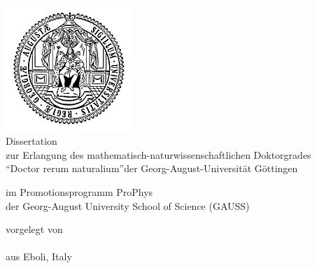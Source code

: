 
\begin{titlepage}
    \begin{center}
        \large  

        \hfill

        \vfill

        \begingroup
            \color{Maroon}\spacedallcaps{\myTitle} \\ \bigskip
        \endgroup


        \vspace{2cm}

        \includegraphics[scale=3]{Graphics/logo} \\ 
        
        \vspace{3cm}
        Dissertation\\ 
        zur Erlangung des mathematisch-naturwissenschaftlichen
        Doktorgrades \\``Doctor rerum naturalium''der Georg-August-Universit\"at 
        G\"ottingen  
        
        \bigskip
        im Promotionsprogramm ProPhys\\ 
        der Georg-August University School of Science (GAUSS) 
        
        \vspace{1cm}       
        vorgelegt von\\
        \myName \\
        aus Eboli, Italy\\
        
        \vspace{1cm}
        

\end{center}
\end{titlepage}
